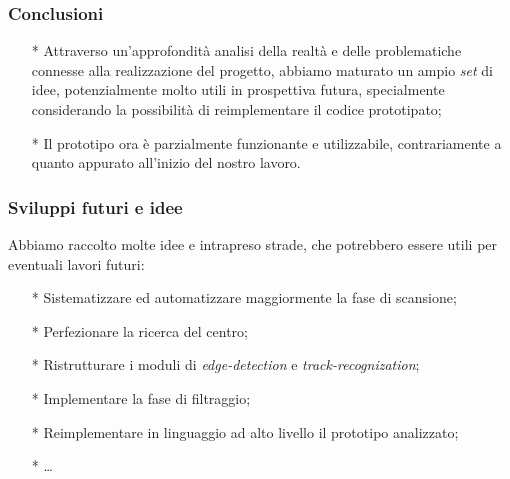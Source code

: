 \begin{frame}
\frametitle{Conclusioni}
\begin{block}{}
\begin{itemize}
\item[*]Attraverso un'approfondità analisi della realtà e delle problematiche
connesse alla realizzazione del progetto, abbiamo maturato un ampio \textit{set}
di idee, potenzialmente molto utili in prospettiva futura, specialmente
considerando la possibilità di reimplementare il codice prototipato;\\
\item[*]Il prototipo ora è parzialmente funzionante e utilizzabile, contrariamente
a quanto appurato all'inizio del nostro lavoro.
\end{itemize}
\end{block}
\end{frame}

\begin{frame}
\frametitle{Sviluppi futuri e idee}
\begin{block}{}
Abbiamo raccolto molte idee e intrapreso strade, che potrebbero essere utili
per eventuali lavori futuri:
\begin{itemize}
\item[*] Sistematizzare ed automatizzare maggiormente la fase di scansione;
\item[*] Perfezionare la ricerca del centro;
\item[*] Ristrutturare i moduli di \emph{edge-detection} e \emph{track-recognization};
\item[*] Implementare la fase di filtraggio;
\item[*] Reimplementare in linguaggio ad alto livello il prototipo analizzato;
\item[*] \dots
\end{itemize}

\end{block}
\end{frame}
